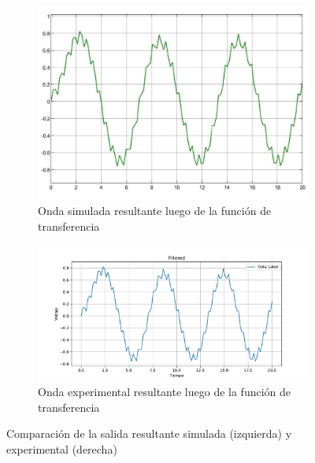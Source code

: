 \begin{figure}[htbp]
    \centering
    \begin{subfigure}[b]{0.35\textwidth}
        \centering
        \includegraphics[width=\textwidth]{fig/especifico_2/onda_filtrada.pdf}
        \caption{Onda simulada resultante luego de la función de transferencia}
        \label{fig:onda_filtrada_simulada_matlab}
    \end{subfigure}
    \hfill
    \begin{subfigure}[b]{0.45\textwidth}
        \centering
        \includegraphics[width=\textwidth]{fig/especifico_2/Filtered.pdf}
        \caption{Onda experimental resultante luego de la función de transferencia}
        \label{fig:onda_filtrada_experimental_zedboard}
    \end{subfigure}
    \caption{Comparación de la salida resultante simulada (izquierda) y experimental (derecha)}
    \label{fig:comparacion_salida_resultante}
\end{figure}

